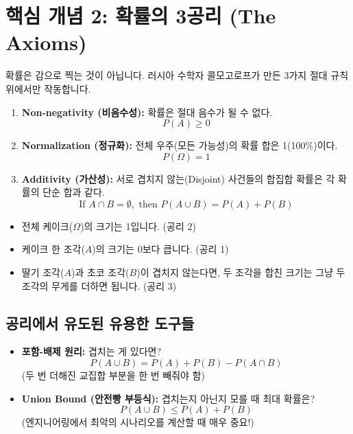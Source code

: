 \documentclass[11pt,a4paper]{book}
\theoremstyle{definition}
\begin{document}
\section{핵심 개념 2: 확률의 3공리 (The Axioms)}

확률은 감으로 찍는 것이 아닙니다. 러시아 수학자 콜모고로프가 만든 3가지 절대 규칙 위에서만 작동합니다.

\begin{conceptbox}[title={콜모고로프의 3공리}]
\begin{enumerate}
    \item \textbf{Non-negativity (비음수성):} 확률은 절대 음수가 될 수 없다.
    \[ P(A) \ge 0 \]
    \item \textbf{Normalization (정규화):} 전체 우주(모든 가능성)의 확률 합은 1(100\%)이다.
    \[ P(\Omega) = 1 \]
    \item \textbf{Additivity (가산성):} 서로 겹치지 않는(Disjoint) 사건들의 합집합 확률은 각 확률의 단순 합과 같다.
    \[ \text{If } A \cap B = \emptyset, \text{ then } P(A \cup B) = P(A) + P(B) \]
\end{enumerate}
\end{conceptbox}

\begin{examplebox}[title={공리의 적용: 케이크 자르기}]
\begin{itemize}
    \item 전체 케이크($\Omega$)의 크기는 1입니다. (공리 2)
    \item 케이크 한 조각($A$)의 크기는 0보다 큽니다. (공리 1)
    \item 딸기 조각($A$)과 초코 조각($B$)이 겹치지 않는다면, 두 조각을 합친 크기는 그냥 두 조각의 무게를 더하면 됩니다. (공리 3)
\end{itemize}
\end{examplebox}

\subsection{공리에서 유도된 유용한 도구들}
\begin{itemize}
    \item \textbf{포함-배제 원리:} 겹치는 게 있다면?
    \[ P(A \cup B) = P(A) + P(B) - P(A \cap B) \]
    (두 번 더해진 교집합 부분을 한 번 빼줘야 함)
    
    \item \textbf{Union Bound (안전빵 부등식):} 겹치는지 아닌지 모를 때 최대 확률은?
    \[ P(A \cup B) \le P(A) + P(B) \]
    (엔지니어링에서 최악의 시나리오를 계산할 때 매우 중요!)
\end{itemize}
\end{document}
